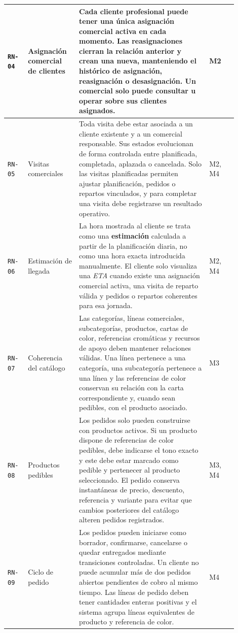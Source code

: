 {\begin{supertabular}{|>{\raggedright\arraybackslash}p{0.08\linewidth}|>{\raggedright\arraybackslash}p{0.20\linewidth}|>{\raggedright\arraybackslash}p{0.51\linewidth}|>{\raggedright\arraybackslash}p{0.11\linewidth}|}
\texttt{RN-04} & Asignación comercial de clientes & Cada cliente profesional puede tener \textbf{una única asignación comercial activa} en cada momento. Las reasignaciones cierran la relación anterior y crean una nueva, manteniendo el histórico de asignación, reasignación o desasignación. Un comercial solo puede consultar u operar sobre sus clientes asignados. & M2 \\
\hline

\texttt{RN-05} & Visitas comerciales & Toda visita debe estar asociada a un cliente existente y a un comercial responsable. Sus estados evolucionan de forma controlada entre planificada, completada, aplazada o cancelada. Solo las visitas planificadas permiten ajustar planificación, pedidos o repartos vinculados, y para completar una visita debe registrarse un resultado operativo. & M2, M4 \\
\hline

\texttt{RN-06} & Estimación de llegada & La hora mostrada al cliente se trata como una \textbf{estimación} calculada a partir de la planificación diaria, no como una hora exacta introducida manualmente. El cliente solo visualiza una \textit{ETA} cuando existe una asignación comercial activa, una visita de reparto válida y pedidos o repartos coherentes para esa jornada. & M2, M4 \\
\hline

\texttt{RN-07} & Coherencia del catálogo & Las categorías, líneas comerciales, subcategorías, productos, cartas de color, referencias cromáticas y recursos de apoyo deben mantener relaciones válidas. Una línea pertenece a una categoría, una subcategoría pertenece a una línea y las referencias de color conservan su relación con la carta correspondiente y, cuando sean pedibles, con el producto asociado. & M3 \\
\hline

\texttt{RN-08} & Productos pedibles & Los pedidos solo pueden construirse con productos activos. Si un producto dispone de referencias de color pedibles, debe indicarse el tono exacto y este debe estar marcado como pedible y pertenecer al producto seleccionado. El pedido conserva instantáneas de precio, descuento, referencia y variante para evitar que cambios posteriores del catálogo alteren pedidos registrados. & M3, M4 \\
\hline

\texttt{RN-09} & Ciclo de pedido & Los pedidos pueden iniciarse como borrador, confirmarse, cancelarse o quedar entregados mediante transiciones controladas. Un cliente no puede acumular más de dos pedidos abiertos pendientes de cobro al mismo tiempo. Las líneas de pedido deben tener cantidades enteras positivas y el sistema agrupa líneas equivalentes de producto y referencia de color. & M4 \\
\hline


\end{supertabular}}
